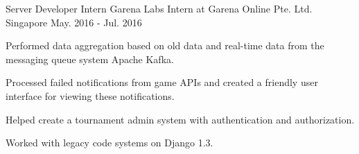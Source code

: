 

\begin{cventries}

	\cventry
	{Server Developer Intern} %
	{Garena Labs Intern at Garena Online Pte. Ltd.} %
	{Singapore} %
	{May. 2016 - Jul. 2016} %
	{
		\begin{cvitems} %
		\item {Performed data aggregation based on old data and real-time data from the messaging queue system Apache Kafka.}
		\item {Processed failed notifications from game APIs and created a friendly user interface for viewing these notifications.}
		\item {Helped create a tournament admin system with authentication and authorization.}
		\item {Worked with legacy code systems on Django 1.3.}
		\end{cvitems}
	}

\end{cventries}
